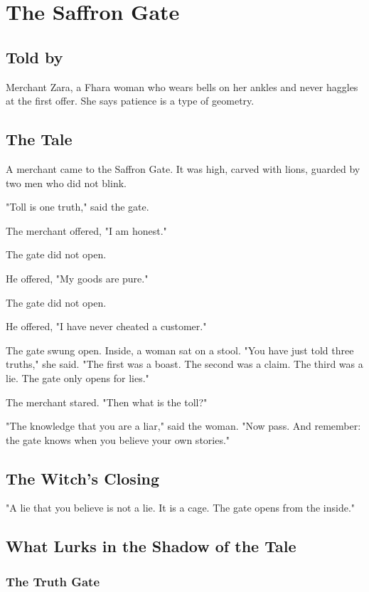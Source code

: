 \chapter{The Saffron Gate}

\section*{Told by}
Merchant Zara, a Fhara woman who wears bells on her ankles and never haggles at the first offer. She says patience is a type of geometry.

\section*{The Tale}

A merchant came to the Saffron Gate. It was high, carved with lions, guarded by two men who did not blink.

"Toll is one truth," said the gate.

The merchant offered, "I am honest."

The gate did not open.

He offered, "My goods are pure."

The gate did not open.

He offered, "I have never cheated a customer."

The gate swung open. Inside, a woman sat on a stool. "You have just told three truths," she said. "The first was a boast. The second was a claim. The third was a lie. The gate only opens for lies."

The merchant stared. "Then what is the toll?"

"The knowledge that you are a liar," said the woman. "Now pass. And remember: the gate knows when you believe your own stories."

\section*{The Witch's Closing}
"A lie that you believe is not a lie. It is a cage. The gate opens from the inside."

\section*{What Lurks in the Shadow of the Tale}

\subsection*{The Truth Gate}

